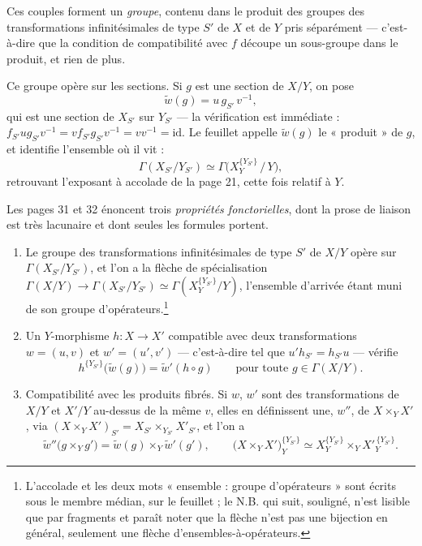 \documentclass[11pt,a4paper]{article}
\begin{document}
Ces couples forment un \emph{groupe}, contenu dans le produit des groupes des
transformations infinitésimales de type $S'$ de $X$ et de $Y$ pris séparément —
c'est-à-dire que la condition de compatibilité avec $f$ découpe un sous-groupe
dans le produit, et rien de plus.

Ce groupe opère sur les sections. Si $g$ est une section de $X/Y$, on pose
\[
  \widetilde{w}(g) = u \, g_{S'} \, v^{-1} ,
\]
qui est une section de $X_{S'}$ sur $Y_{S'}$ — la vérification est immédiate :
$f_{S'} u g_{S'} v^{-1} = v f_{S'} g_{S'} v^{-1} = v v^{-1} = \mathrm{id}$. Le
feuillet appelle $\widetilde{w}(g)$ le « produit » de $g$, et identifie
l'ensemble où il vit :
\[
  \Gamma(X_{S'}/Y_{S'}) \simeq
  \Gamma\bigl(X_{Y}^{\{Y_{S'}\}} \,/\, Y\bigr) ,
\]
retrouvant l'exposant à accolade de la page 21, cette fois relatif à $Y$.

Les pages 31 et 32 énoncent trois \emph{propriétés fonctorielles}, dont la
prose de liaison est très lacunaire et dont seules les formules portent.

\begin{enumerate}
  \item[1)] Le groupe des transformations infinitésimales de type $S'$ de
  $X/Y$ opère sur $\Gamma(X_{S'}/Y_{S'})$, et l'on a la flèche de
  spécialisation $\Gamma(X/Y) \to \Gamma(X_{S'}/Y_{S'}) \simeq
  \Gamma(X_{Y}^{\{Y_{S'}\}}/Y)$, l'ensemble d'arrivée étant muni de son groupe
  d'opérateurs.\footnote{L'accolade et les deux mots « ensemble : groupe
  d'opérateurs » sont écrits sous le membre médian, sur le feuillet ; le N.B.
  qui suit, souligné, n'est lisible que par fragments et paraît noter que la
  flèche n'est pas une bijection en général, seulement une flèche
  d'ensembles-à-opérateurs.}
  \item[2)] Un $Y$-morphisme $h : X \to X'$ compatible avec deux
  transformations $w = (u,v)$ et $w' = (u',v')$ — c'est-à-dire tel que $u'
  h_{S'} = h_{S'} u$ — vérifie
  \[
    h^{\{Y_{S'}\}}\bigl(\widetilde{w}(g)\bigr) = \widetilde{w}'(h \circ g)
    \qquad \text{pour toute } g \in \Gamma(X/Y) .
  \]
  \item[3)] Compatibilité avec les produits fibrés. Si $w$, $w'$ sont des
  transformations de $X/Y$ et $X'/Y$ au-dessus de la même $v$, elles en
  définissent une, $w''$, de $X \times_{Y} X'$, via
  $(X \times_{Y} X')_{S'} = X_{S'} \times_{Y_{S'}} X'_{S'}$, et l'on a
  \[
    \widetilde{w}''\bigl(g \times_{Y} g'\bigr) = \widetilde{w}(g) \times_{Y}
    \widetilde{w}'(g') ,
    \qquad
    \bigl(X \times_{Y} X'\bigr)_{Y}^{\{Y_{S'}\}} \simeq
    X_{Y}^{\{Y_{S'}\}} \times_{Y} X'^{\,\{Y_{S'}\}}_{Y} .
  \]
\end{enumerate}
\end{document}

